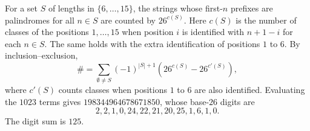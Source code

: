 For a set $S$ of lengths in $\{6,\dots,15\}$, the strings whose first-$n$ prefixes are palindromes for all $n\in S$ are counted by $26^{c(S)}$. Here $c(S)$ is the number of classes of the positions $1,\dots,15$ when position $i$ is identified with $n+1-i$ for each $n\in S$. The same holds with the extra identification of positions $1$ to $6$. By inclusion--exclusion,
\[\#=\sum_{\emptyset\ne S}(-1)^{|S|+1}\left(26^{c(S)}-26^{c'(S)}\right),\]
where $c'(S)$ counts classes when positions $1$ to $6$ are also identified. Evaluating the $1023$ terms gives $198344964678671850$, whose base-$26$ digits are
\[2,2,1,0,24,22,21,20,25,1,6,1,0.\]
The digit sum is $\boxed{125}$.
